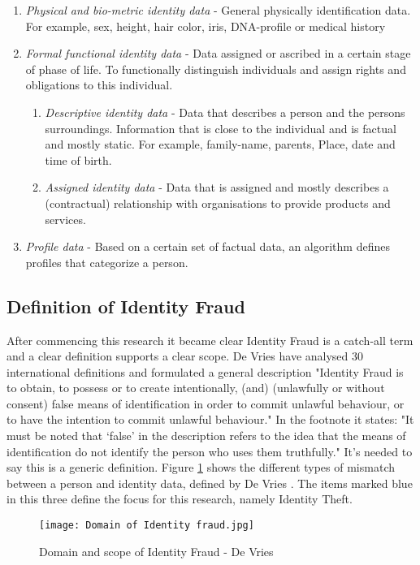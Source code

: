 \begin{enumerate}
\item \textit{Physical and bio-metric identity data} - General physically identification data. For example, sex, height, hair color, iris, DNA-profile or medical history
\item \textit{Formal functional identity data} - Data assigned or ascribed in a certain stage of phase of life. To functionally distinguish individuals and assign rights and obligations to this individual.
\begin{enumerate}
\item \textit{Descriptive identity data} - Data that describes a person and the persons surroundings. Information that is close to the individual and is factual and mostly static. For example, family-name, parents, Place, date and time of birth. 
\item \textit{Assigned identity data} - Data that is assigned and mostly describes a (contractual) relationship with organisations to provide products and services.
\end{enumerate}
\item \textit{Profile data} - Based on a certain set of factual data, an algorithm defines profiles that categorize a person. 
\end{enumerate}

\subsection{Definition of Identity Fraud}\label{Def_ID_Fraud}
After commencing this research it became clear Identity Fraud is a catch-all term and a clear definition supports a clear scope. De Vries \etal \cite{97408536fd1c4f4e9d1615b7a4a4473e} have analysed 30 international definitions and formulated a general description "Identity Fraud is to obtain, to possess or to create intentionally, (and) (unlawfully or without consent) false means of identification in order to commit unlawful behaviour, or to have the intention to commit unlawful behaviour." In the footnote it states: "It must be noted that ‘false’ in the description refers to the idea that the means of identification do not identify the person who uses them truthfully." It's needed to say this is a generic definition. Figure \ref{fig:ID_fraud} shows the different types of mismatch between a person and identity data, defined by De Vries \etal \cite{Vries2007IdentiteitsfraudeEA}. The items marked blue in this three define the focus for this research, namely Identity Theft.
\graphicspath{ {./images/} }
\begin{figure}
\texttt{[image: Domain of Identity fraud.jpg]}\\
\caption{Domain and scope of Identity Fraud - De Vries \etal \cite{Vries2007IdentiteitsfraudeEA}}
\label{fig:ID_fraud}
\end{figure}

